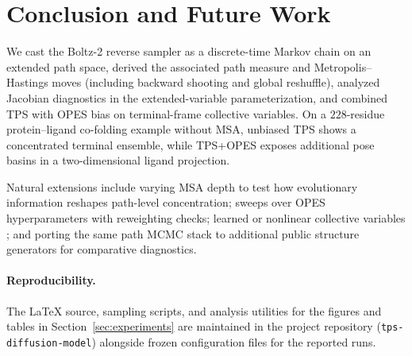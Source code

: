 \section{Conclusion and Future Work}
\label{sec:conclusion}

We cast the Boltz-2 reverse sampler as a discrete-time Markov chain on an
extended path space, derived the associated path measure and Metropolis--Hastings
moves (including backward shooting and global reshuffle), analyzed Jacobian
diagnostics in the extended-variable parameterization, and combined TPS with
OPES bias on terminal-frame collective variables. On a $228$-residue
protein--ligand co-folding example without MSA, unbiased TPS shows a concentrated
terminal ensemble, while TPS+OPES exposes additional pose basins in a
two-dimensional ligand projection.

Natural extensions include varying MSA depth to test how evolutionary
information reshapes path-level concentration; sweeps over OPES hyperparameters
with reweighting checks; learned or nonlinear collective variables
\citep{invernizzi2022}; and porting the same path MCMC stack to additional
public structure generators for comparative diagnostics.

\paragraph{Reproducibility.}
The LaTeX source, sampling scripts, and analysis utilities for the figures and
tables in Section~\ref{sec:experiments} are maintained in the project
repository (\texttt{tps-diffusion-model}) alongside frozen configuration files
for the reported runs.
